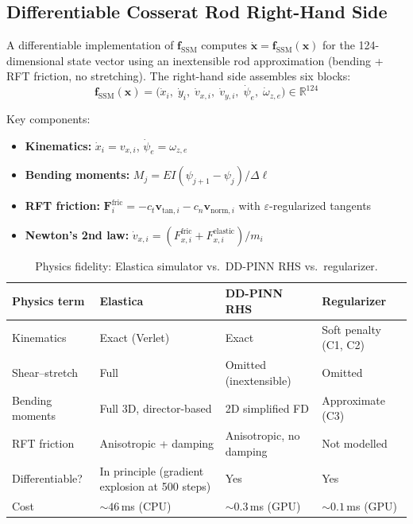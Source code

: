 \documentclass[11pt]{article}
\newcommand{\fssm}{\mathbf{f}_{\mathrm{SSM}}}
\begin{document}
\subsection{Differentiable Cosserat Rod Right-Hand Side}
\label{sec:pinn:cosserat-rhs}

A differentiable implementation of $\fssm$ computes $\dot{\mathbf{x}} = \fssm(\mathbf{x})$ for the 124-dimensional state vector using an inextensible rod approximation (bending + RFT friction, no stretching).
The right-hand side assembles six blocks:
\begin{equation}
  \fssm(\mathbf{x}) = \bigl(\dot{x}_i,\; \dot{y}_i,\; \dot{v}_{x,i},\; \dot{v}_{y,i},\; \dot{\psi}_e,\; \dot{\omega}_{z,e}\bigr) \in \mathbb{R}^{124}
  \label{eq:pinn:rhs-full}
\end{equation}

Key components:
\begin{itemize}
  \item \textbf{Kinematics:} $\dot{x}_i = v_{x,i}$, $\dot{\psi}_e = \omega_{z,e}$
  \item \textbf{Bending moments:} $M_j = EI(\psi_{j+1} - \psi_j)/\Delta\ell$
  \item \textbf{RFT friction:} $\mathbf{F}_i^{\text{fric}} = -c_t\mathbf{v}_{\text{tan},i} - c_n\mathbf{v}_{\text{norm},i}$ with $\varepsilon$-regularized tangents
  \item \textbf{Newton's 2nd law:} $\dot{v}_{x,i} = (F_{x,i}^{\text{fric}} + F_{x,i}^{\text{elastic}})/m_i$
\end{itemize}

\begin{table}[H]
\centering
\footnotesize
\renewcommand{\arraystretch}{1.25}
\caption{Physics fidelity: Elastica simulator vs.\ DD-PINN RHS vs.\ regularizer.}
\label{tab:pinn:physics-comparison}
\begin{tabular}{@{} p{2.8cm} p{3.4cm} p{3.4cm} p{3.4cm} @{}}
\toprule
\textbf{Physics term} &
  \textbf{Elastica} &
  \textbf{DD-PINN RHS} &
  \textbf{Regularizer} \\
\midrule
Kinematics & Exact (Verlet) & Exact & Soft penalty (C1, C2) \\
Shear--stretch & Full & Omitted (inextensible) & Omitted \\
Bending moments & Full 3D, director-based & 2D simplified FD & Approximate (C3) \\
RFT friction & Anisotropic + damping & Anisotropic, no damping & Not modelled \\
Differentiable? & In principle (gradient explosion at 500 steps) & Yes & Yes \\
Cost & ${\sim}46$\,ms (CPU) & ${\sim}0.3$\,ms (GPU) & ${\sim}0.1$\,ms (GPU) \\
\bottomrule
\end{tabular}
\end{table}
\end{document}
